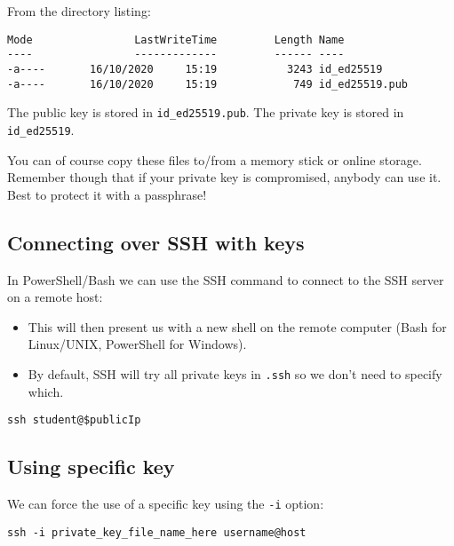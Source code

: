 \documentclass[slides]{pgnotes}
\begin{document}
From the directory listing:

\begin{verbatim}
Mode                LastWriteTime         Length Name
----                -------------         ------ ----
-a----       16/10/2020     15:19           3243 id_ed25519
-a----       16/10/2020     15:19            749 id_ed25519.pub
\end{verbatim}

The public key is stored in \texttt{id\_ed25519.pub}.
The private key is stored in \texttt{id\_ed25519}.

You can of course copy these files to/from a memory stick or online storage.
Remember though that if your private key is compromised, anybody can use it.
Best to protect it with a passphrase!




\subsection{Connecting over SSH with keys}
\label{sec:connecting-over-ssh-with-keys}

In PowerShell/Bash we can use the SSH command to connect to the SSH server on a remote host:
\begin{itemize}
\item This will then present us with a new shell on the remote computer (Bash for Linux/UNIX, PowerShell for Windows).
\item By default, SSH will try all private keys in \texttt{.ssh} so we don't need to specify which.
\end{itemize}

\begin{verbatim}
ssh student@$publicIp 
\end{verbatim}


\subsection{Using specific key}

We can force the use of a specific key using the \texttt{-i} option:

\begin{verbatim}
ssh -i private_key_file_name_here username@host
\end{verbatim}
\end{document}
